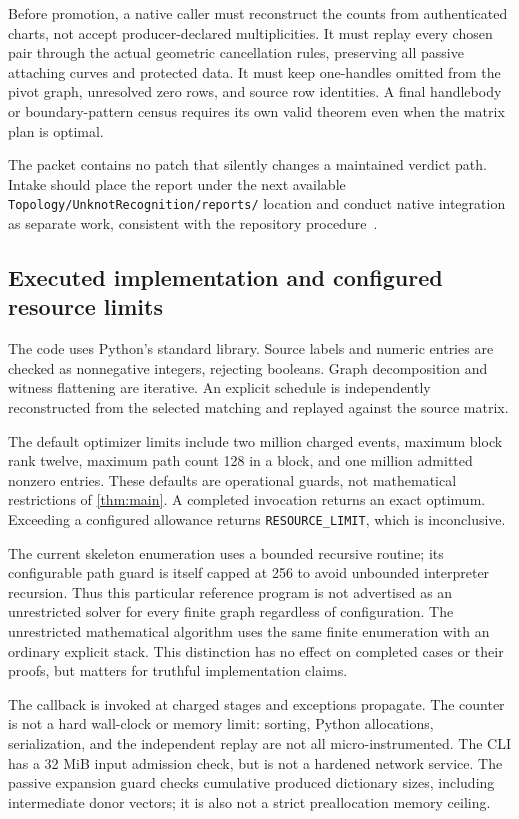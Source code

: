 \documentclass[11pt,letterpaper]{article}
\theoremstyle{definition}
\theoremstyle{remark}
\newcommand{\code}[1]{\texttt{\small #1}}
\begin{document}
Before promotion, a native caller must reconstruct the counts from authenticated charts, not accept producer-declared multiplicities. It must replay every chosen pair through the actual geometric cancellation rules, preserving all passive attaching curves and protected data. It must keep one-handles omitted from the pivot graph, unresolved zero rows, and source row identities. A final handlebody or boundary-pattern census requires its own valid theorem even when the matrix plan is optimal.

The packet contains no patch that silently changes a maintained verdict path. Intake should place the report under the next available \code{Topology/UnknotRecognition/reports/} location and conduct native integration as separate work, consistent with the repository procedure~\cite{intake}.

\subsection{Executed implementation and configured resource limits}
The code uses Python's standard library. Source labels and numeric entries are checked as nonnegative integers, rejecting booleans. Graph decomposition and witness flattening are iterative. An explicit schedule is independently reconstructed from the selected matching and replayed against the source matrix.

The default optimizer limits include two million charged events, maximum block rank twelve, maximum path count 128 in a block, and one million admitted nonzero entries. These defaults are operational guards, not mathematical restrictions of \cref{thm:main}. A completed invocation returns an exact optimum. Exceeding a configured allowance returns \code{RESOURCE\_LIMIT}, which is inconclusive.

The current skeleton enumeration uses a bounded recursive routine; its configurable path guard is itself capped at 256 to avoid unbounded interpreter recursion. Thus this particular reference program is not advertised as an unrestricted solver for every finite graph regardless of configuration. The unrestricted mathematical algorithm uses the same finite enumeration with an ordinary explicit stack. This distinction has no effect on completed cases or their proofs, but matters for truthful implementation claims.

The callback is invoked at charged stages and exceptions propagate. The counter is not a hard wall-clock or memory limit: sorting, Python allocations, serialization, and the independent replay are not all micro-instrumented. The CLI has a 32 MiB input admission check, but is not a hardened network service. The passive expansion guard checks cumulative produced dictionary sizes, including intermediate donor vectors; it is also not a strict preallocation memory ceiling.
\end{document}
